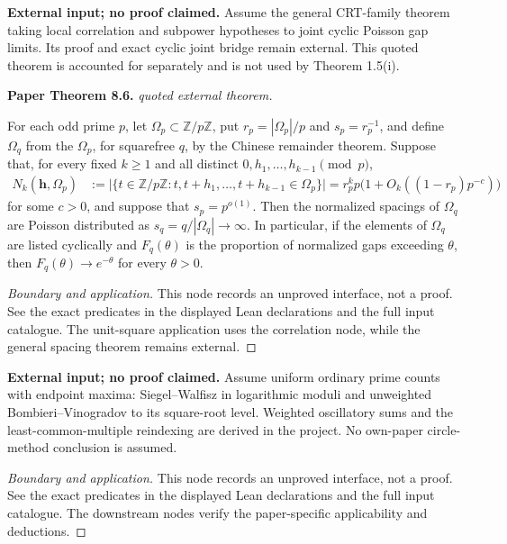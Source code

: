 \begin{lemma}
\label{input_gk}
\textbf{External input; no proof claimed.} Assume the general CRT-family theorem taking local correlation and subpower hypotheses to joint cyclic Poisson gap limits. Its proof and exact cyclic joint bridge remain external. This quoted theorem is accounted for separately and is not used by Theorem 1.5(i).
\par\medskip\noindent\textbf{Paper Theorem 8.6.} \textit{quoted external theorem.}\par
For each odd prime $p$, let $\Omega_p\subset\mathbb Z/p\mathbb Z$, put
$r_p=|\Omega_p|/p$ and $s_p=r_p^{-1}$, and define $\Omega_q$ from the
$\Omega_p$, for squarefree $q$, by the Chinese remainder theorem.  Suppose
that, for every fixed $k\geq1$ and all distinct
$0,h_1,\ldots,h_{k-1}\pmod p$,
\begin{align}
 N_k(\mathbf h,\Omega_p)
 &:=\big|\{t\in \mathbb{Z}/p\mathbb{Z}:t,t+h_1,\ldots,t+h_{k-1}\in\Omega_p\}\big|=r_p^kp\big(1+O_k((1-r_p)p^{-c})\big)             
\end{align}
for some $c>0$, and suppose that $s_p=p^{o(1)}$.  Then the normalized spacings
of $\Omega_q$ are Poisson distributed as $s_q=q/|\Omega_q|\to\infty$.
In particular, if the elements of $\Omega_q$ are listed cyclically and
$F_q(\theta)$ is the proportion of normalized gaps exceeding $\theta$, then
$F_q(\theta)\to e^{-\theta}$ for every $\theta>0$.
\end{lemma}
\begin{proof}[Boundary and application]
This node records an unproved interface, not a proof. See the exact predicates in the displayed Lean declarations and the full input catalogue. The unit-square application uses the correlation node, while the general spacing theorem remains external.
\end{proof}

\begin{lemma}
\label{input_sw_bv}
\textbf{External input; no proof claimed.} Assume uniform ordinary prime counts with endpoint maxima: Siegel--Walfisz in logarithmic moduli and unweighted Bombieri--Vinogradov to its square-root level. Weighted oscillatory sums and the least-common-multiple reindexing are derived in the project. No own-paper circle-method conclusion is assumed.
\end{lemma}
\begin{proof}[Boundary and application]
This node records an unproved interface, not a proof. See the exact predicates in the displayed Lean declarations and the full input catalogue. The downstream nodes verify the paper-specific applicability and deductions.
\end{proof}

